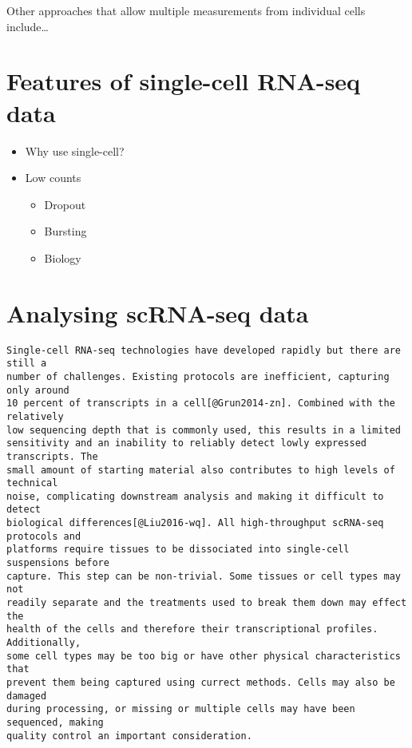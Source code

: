 \documentclass[11pt,a4paper,titlepage,twoside,openright]{style/unimelbthesis}
\theoremstyle{definition}
\theoremstyle{definition}
\theoremstyle{definition}
\theoremstyle{remark}
\begin{document}
\begin{mainmatter}
Other approaches that allow multiple measurements from individual cells include\ldots{}

\hypertarget{features-of-single-cell-rna-seq-data}{%
\section{Features of single-cell RNA-seq data}\label{features-of-single-cell-rna-seq-data}}

\begin{itemize}
\tightlist
\item
  Why use single-cell?
\item
  Low counts

  \begin{itemize}
  \tightlist
  \item
    Dropout
  \item
    Bursting
  \item
    Biology
  \end{itemize}
\end{itemize}

\hypertarget{analysing-scrna-seq-data}{%
\section{Analysing scRNA-seq data}\label{analysing-scrna-seq-data}}

\begin{verbatim}
Single-cell RNA-seq technologies have developed rapidly but there are still a
number of challenges. Existing protocols are inefficient, capturing only around
10 percent of transcripts in a cell[@Grun2014-zn]. Combined with the relatively
low sequencing depth that is commonly used, this results in a limited
sensitivity and an inability to reliably detect lowly expressed transcripts. The
small amount of starting material also contributes to high levels of technical
noise, complicating downstream analysis and making it difficult to detect
biological differences[@Liu2016-wq]. All high-throughput scRNA-seq protocols and
platforms require tissues to be dissociated into single-cell suspensions before
capture. This step can be non-trivial. Some tissues or cell types may not
readily separate and the treatments used to break them down may effect the
health of the cells and therefore their transcriptional profiles. Additionally,
some cell types may be too big or have other physical characteristics that
prevent them being captured using currect methods. Cells may also be damaged
during processing, or missing or multiple cells may have been sequenced, making
quality control an important consideration.


\end{verbatim}
\end{mainmatter}
\end{document}
